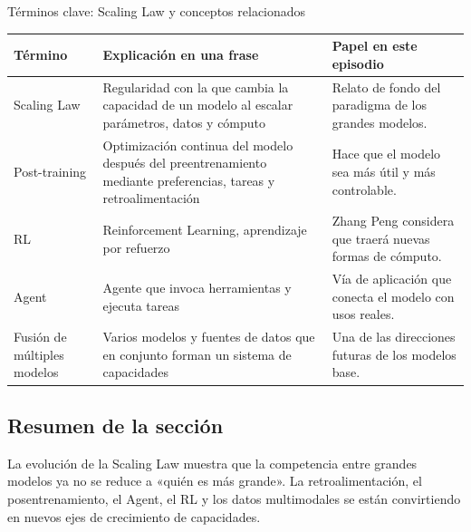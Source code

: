\begin{knowledgebox}{Términos clave: Scaling Law y conceptos relacionados}
\begin{tabularx}{\textwidth}{p{}p{}X}
\toprule
Término & Explicación en una frase & Papel en este episodio \\
\midrule
Scaling Law & Regularidad con la que cambia la capacidad de un modelo al escalar parámetros, datos y cómputo & Relato de fondo del paradigma de los grandes modelos. \\
Post-training & Optimización continua del modelo después del preentrenamiento mediante preferencias, tareas y retroalimentación & Hace que el modelo sea más útil y más controlable. \\
RL & Reinforcement Learning, aprendizaje por refuerzo & Zhang Peng considera que traerá nuevas formas de cómputo. \\
Agent & Agente que invoca herramientas y ejecuta tareas & Vía de aplicación que conecta el modelo con usos reales. \\
Fusión de múltiples modelos & Varios modelos y fuentes de datos que en conjunto forman un sistema de capacidades & Una de las direcciones futuras de los modelos base. \\
\bottomrule
\end{tabularx}
\end{knowledgebox}

\subsection{Resumen de la sección}

La evolución de la Scaling Law muestra que la competencia entre grandes modelos ya no se reduce a «quién es más grande». La retroalimentación, el posentrenamiento, el Agent, el RL y los datos multimodales se están convirtiendo en nuevos ejes de crecimiento de capacidades.
